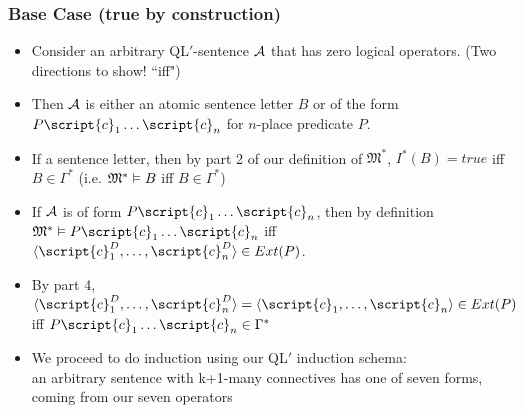 \begin{frame}
\frametitle{Base Case (true by construction)}

\begin{itemize}[<+->]

\item Consider an arbitrary QL$'$-sentence $\mathcal{A}$ that has zero logical operators. (Two directions to show! ``iff")

\item Then $\mathcal{A}$ is either an atomic sentence letter $B$ or of the form $P\script{c}_1 \dots \script{c}_n$ for $n$-place predicate $P$. 

\item If a sentence letter, then by part 2 of our definition of $\mathfrak{M}^{\ast}$, $I^{\ast}(B) = true$ iff $B \in \Gamma^{\ast}$ (i.e. $\mathfrak{M}^{\ast} \vDash B$ iff $B \in \Gamma^{\ast}$)

\item If $\mathcal{A}$ is of form $P\script{c}_1 \dots \script{c}_n$, then by definition $\mathfrak{M}^{\ast} \entails P\script{c}_1 \dots \script{c}_n$ iff $\langle \script{c}^D_1, \dots, \script{c}^D_n \rangle \in Ext(P)$. 

\item[] By part 4, $\langle \script{c}^D_1, \dots, \script{c}^D_n \rangle = \langle \script{c}_1, \dots, \script{c}_n \rangle \in Ext(P)$ iff $P\script{c}_1 \dots \script{c}_n \in \Gamma^{\ast}$



\item We proceed to do induction using our QL$'$ induction schema: \\ an arbitrary sentence  with k+1-many connectives has one of seven forms, coming from our seven operators 

\end{itemize}
\end{frame}

